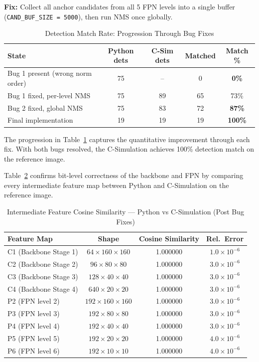 \textbf{Fix:} Collect all anchor candidates from all 5 FPN levels into a single buffer (\texttt{CAND\_BUF\_SIZE = 5000}), then run NMS once globally.

\begin{table}[H]
\centering
\caption{Detection Match Rate: Progression Through Bug Fixes}
\begin{tabular}{|l|c|c|c|c|}
\hline
\textbf{State} & \textbf{Python dets} & \textbf{C-Sim dets} & \textbf{Matched} & \textbf{Match \%} \\
\hline
Bug 1 present (wrong norm order) & 75 & -- & 0 & \textbf{0\%} \\
Bug 1 fixed, per-level NMS       & 75 & 89 & 65 & 73\% \\
Bug 2 fixed, global NMS          & 75 & 83 & 72 & \textbf{87\%} \\
Final implementation             & 19 & 19 & 19 & \textbf{100\%} \\
\hline
\end{tabular}
\label{table:bug_progression}
\end{table}

The progression in Table~\ref{table:bug_progression} captures the quantitative improvement through each fix. With both bugs resolved, the C-Simulation achieves 100\% detection match on the reference image.

Table~\ref{table:feature_cossim} confirms bit-level correctness of the backbone and FPN by comparing every intermediate feature map between Python and C-Simulation on the reference image.

\begin{table}[H]
\centering
\caption{Intermediate Feature Cosine Similarity — Python vs C-Simulation (Post Bug Fixes)}
\begin{tabular}{|l|c|c|c|}
\hline
\textbf{Feature Map} & \textbf{Shape} & \textbf{Cosine Similarity} & \textbf{Rel.\ Error} \\
\hline
C1 (Backbone Stage 1) & $64 \times 160 \times 160$ & 1.000000 & $1.0 \times 10^{-6}$ \\
C2 (Backbone Stage 2) & $96 \times 80 \times 80$   & 1.000000 & $3.0 \times 10^{-6}$ \\
C3 (Backbone Stage 3) & $128 \times 40 \times 40$  & 1.000000 & $3.0 \times 10^{-6}$ \\
C4 (Backbone Stage 4) & $640 \times 20 \times 20$  & 1.000000 & $3.0 \times 10^{-6}$ \\
P2 (FPN level 2)      & $192 \times 160 \times 160$& 1.000000 & $3.0 \times 10^{-6}$ \\
P3 (FPN level 3)      & $192 \times 80 \times 80$  & 1.000000 & $3.0 \times 10^{-6}$ \\
P4 (FPN level 4)      & $192 \times 40 \times 40$  & 1.000000 & $3.0 \times 10^{-6}$ \\
P5 (FPN level 5)      & $192 \times 20 \times 20$  & 1.000000 & $4.0 \times 10^{-6}$ \\
P6 (FPN level 6)      & $192 \times 10 \times 10$  & 1.000000 & $4.0 \times 10^{-6}$ \\
\hline
\end{tabular}
\label{table:feature_cossim}
\end{table}

